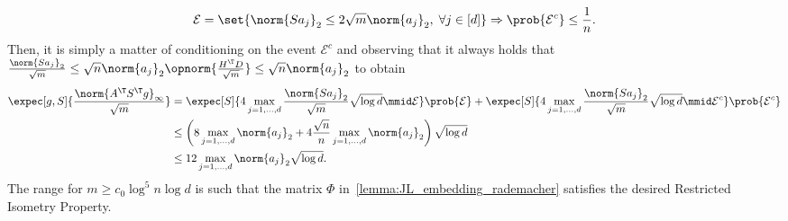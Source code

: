 \documentclass[a4paper]{article}
\begin{document}
\[
	\mathcal{E} = \set{\norm{S a_j}_2 \leq 2 \sqrt{m} \norm{a_j}_2, \;
	\forall j \in [d]} \Rightarrow
	\prob{\mathcal{E}^c} \leq \frac{1}{n}.
\]
Then, it is simply a matter of conditioning on the event $\mathcal{E}^c$ and
observing that it always holds that $\frac{\norm{S a_j}_2}{\sqrt{m}} \leq \sqrt{n}
\norm{a_j}_2 \opnorm{\frac{H^\T D}{\sqrt{m}}} \leq \sqrt{n} \norm{a_j}_2$ to
obtain
\begin{align*}
	\expec[g, S]{\frac{\norm{A^\T S^\T g}_{\infty}}{\sqrt{m}}} &=
	\expec[S]{4 \max_{j=1,\dots,d} \frac{\norm{S a_j}_2}{\sqrt{m}}
		\sqrt{\log d} \mmid \mathcal{E}} \prob{\mathcal{E}} +
	\expec[S]{4 \max_{j=1, \dots, d} \frac{\norm{S a_j}_2}{\sqrt{m}}
		\sqrt{\log d} \mmid \mathcal{E}^c} \prob{\mathcal{E}^c} \\
    &\leq \left( 8 \max_{j = 1, \dots, d} \norm{a_j}_2
      + 4 \frac{\sqrt{n}}{n} \max_{j = 1, \dots, d} \norm{a_j}_2
      \right) \sqrt{\log d} \\
	&\leq 12 \max_{j = 1, \dots, d} \norm{a_j}_2 \sqrt{\log d}.
\end{align*}
The range for $m \geq c_0 \log^5 n \log d$ is such that the matrix $\Phi$
in~\cref{lemma:JL_embedding_rademacher} satisfies the desired Restricted
Isometry Property.



\end{document}
